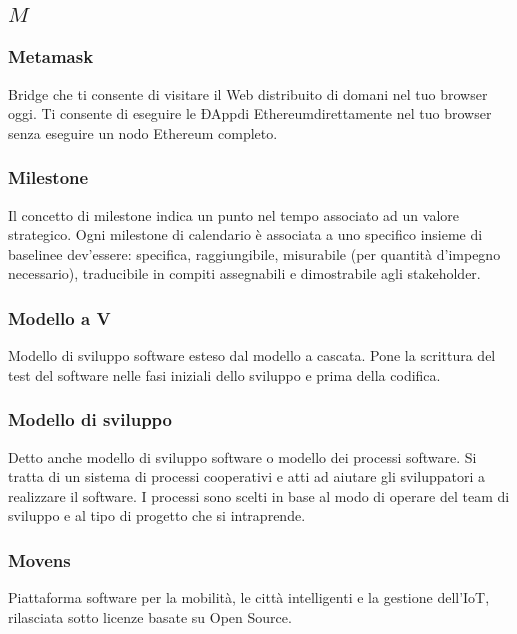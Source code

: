 \subsection*{\quad$M\quad$}
\subsubsection*{Metamask}
Bridge che ti consente di visitare il Web distribuito di domani nel tuo browser oggi. Ti consente di eseguire le ÐApp\glosp di Ethereum\glosp direttamente nel tuo browser senza eseguire un nodo Ethereum completo.

\subsubsection*{Milestone}
Il concetto di milestone indica un punto nel tempo associato ad un valore strategico. Ogni milestone di calendario è associata a uno specifico insieme di baseline\glo e dev'essere: specifica, raggiungibile, misurabile (per quantità d’impegno necessario), traducibile in compiti assegnabili e dimostrabile agli stakeholder\glo.

\subsubsection*{Modello a V}
Modello di sviluppo software esteso dal modello a cascata. Pone la scrittura del test del software nelle fasi iniziali dello sviluppo e prima della codifica.

\subsubsection*{Modello di sviluppo}
Detto anche modello di sviluppo software o modello dei processi software. Si tratta di un sistema di processi cooperativi e atti ad aiutare gli sviluppatori a realizzare il software. I processi sono scelti in base al modo di operare del team di sviluppo e al tipo di progetto che si intraprende.

\subsubsection*{Movens}
Piattaforma software per la mobilità, le città intelligenti e la gestione dell'IoT, rilasciata sotto licenze basate su Open Source\glo.
